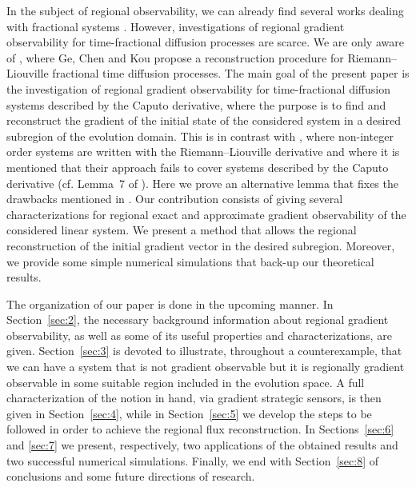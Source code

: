 \documentclass{article}
\begin{document}
In the subject of regional observability, we can already find several works dealing with fractional
systems \cite{MR3955081,me.atanaa,MyID:423,MR4066412,me.matcom.2022,zguaid.2022.2,me.sm2a}. However,
investigations of regional gradient observability for time-fractional diffusion processes are scarce. 
We are only aware of \cite{grad.frac}, where Ge, Chen and Kou propose a reconstruction procedure for
Riemann--Liouville fractional time diffusion processes. The main goal of the present paper is the
investigation of regional gradient observability for time-fractional diffusion systems described 
by the Caputo derivative, where the purpose is to find and reconstruct the gradient 
of the initial state of the considered system in a desired subregion of the evolution domain. 
This is in contrast with \cite{grad.frac}, where non-integer order systems are written with the
Riemann--Liouville derivative and where it is mentioned that their approach fails to cover systems
described by the Caputo derivative (cf. Lemma~7 of \cite{grad.frac}). Here we prove 
an alternative lemma that fixes the drawbacks mentioned in \cite{grad.frac}. 
Our contribution consists of giving several characterizations 
for regional exact and approximate gradient observability of the considered linear system. 
We present a method that allows the regional reconstruction of the initial gradient vector 
in the desired subregion. Moreover, we provide some simple numerical simulations that 
back-up our theoretical results.

The organization of our paper is done in the upcoming manner. 
In Section~\ref{sec:2}, the necessary background information 
about regional gradient observability, as well as some of its 
useful properties and characterizations, are given. Section~\ref{sec:3} 
is devoted to illustrate, throughout a counterexample, that 
we can have a system that is not gradient observable but it is 
regionally gradient observable in some suitable region included in the evolution space. 
A full characterization of the notion in hand, via gradient strategic sensors, 
is then given in Section~\ref{sec:4}, while in Section~\ref{sec:5} we develop 
the steps to be followed in order to achieve the regional flux reconstruction. 
In Sections~\ref{sec:6} and \ref{sec:7} we present, respectively, two applications 
of the obtained results and two successful numerical simulations.
Finally, we end with Section~\ref{sec:8} of conclusions and some future
directions of research.

\end{document}
